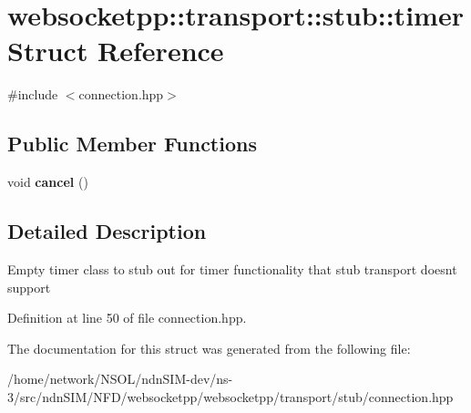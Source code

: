 \hypertarget{structwebsocketpp_1_1transport_1_1stub_1_1timer}{}\section{websocketpp\+:\+:transport\+:\+:stub\+:\+:timer Struct Reference}
\label{structwebsocketpp_1_1transport_1_1stub_1_1timer}


{\ttfamily \#include $<$connection.\+hpp$>$}

\subsection*{Public Member Functions}
\begin{DoxyCompactItemize}
\item 
void {\bfseries cancel} ()\hypertarget{structwebsocketpp_1_1transport_1_1stub_1_1timer_a7c193cb8757d756bb0510a8e1147e9c7}{}\label{structwebsocketpp_1_1transport_1_1stub_1_1timer_a7c193cb8757d756bb0510a8e1147e9c7}

\end{DoxyCompactItemize}


\subsection{Detailed Description}
Empty timer class to stub out for timer functionality that stub transport doesn\textquotesingle{}t support 

Definition at line 50 of file connection.\+hpp.



The documentation for this struct was generated from the following file\+:\begin{DoxyCompactItemize}
\item 
/home/network/\+N\+S\+O\+L/ndn\+S\+I\+M-\/dev/ns-\/3/src/ndn\+S\+I\+M/\+N\+F\+D/websocketpp/websocketpp/transport/stub/connection.\+hpp\end{DoxyCompactItemize}
